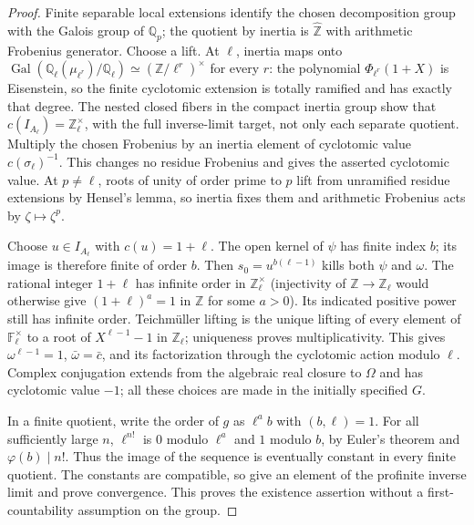 \begin{proof}
Finite separable local extensions identify the chosen decomposition
group with the Galois group of $\mathbb Q_p$; the quotient by inertia
is $\widehat{\mathbb Z}$ with arithmetic Frobenius generator.  Choose
a lift.  At $\ell$, inertia maps onto
$\operatorname{Gal}(\mathbb Q_\ell(\mu_{\ell^r})/\mathbb Q_\ell)
\simeq(\mathbb Z/\ell^r)^\times$ for every $r$: the polynomial
$\Phi_{\ell^r}(1+X)$ is Eisenstein, so the finite cyclotomic
extension is totally ramified and has exactly that degree.
The nested closed fibers in the compact inertia group show that
$c(I_{A_\ell})=\mathbb Z_\ell^\times$, with the full inverse-limit
target, not only each separate quotient.  Multiply the chosen
Frobenius by an inertia element of cyclotomic value
$c(\sigma_\ell)^{-1}$.  This changes no residue Frobenius and gives
the asserted cyclotomic value.  At $p\ne\ell$, roots of unity of
order prime to $p$ lift from unramified residue extensions by
Hensel's lemma, so inertia fixes them and arithmetic Frobenius
acts by $\zeta\mapsto\zeta^p$.

Choose $u\in I_{A_\ell}$ with $c(u)=1+\ell$.
The open kernel of $\psi$ has finite index $b$; its image is
therefore finite of order $b$.  Then
$s_0=u^{b(\ell-1)}$ kills both $\psi$ and $\omega$.
The rational integer $1+\ell$ has infinite order in
$\mathbb Z_\ell^\times$ (injectivity of $\mathbb Z\to\mathbb Z_\ell$
would otherwise give $(1+\ell)^a=1$ in $\mathbb Z$ for some $a>0$).
Its indicated positive power still has infinite order.
Teichm\"uller lifting is the unique lifting of every element of
$\mathbb F_\ell^\times$ to a root of $X^{\ell-1}-1$ in
$\mathbb Z_\ell$; uniqueness proves multiplicativity.  This gives
$\omega^{\ell-1}=1$, $\bar\omega=\bar c$, and its factorization
through the cyclotomic action modulo $\ell$.
Complex conjugation extends from the algebraic real closure to
$\Omega$ and has cyclotomic value $-1$; all these choices are
made in the initially specified $G$.

In a finite quotient, write the order of $g$ as $\ell^a b$ with
$(b,\ell)=1$.  For all sufficiently large $n$, $\ell^{n!}$ is
$0$ modulo $\ell^a$ and $1$ modulo $b$, by Euler's theorem and
$\varphi(b)\mid n!$.  Thus the image of the sequence is eventually
constant in every finite quotient.  The constants are compatible,
so give an element of the profinite inverse limit and prove
convergence.  This proves the existence assertion without a
first-countability assumption on the group.


\end{proof}
